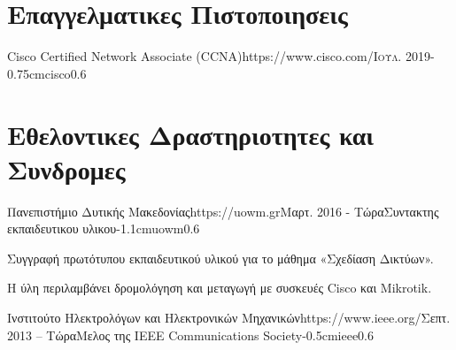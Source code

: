 \documentclass{mycv}
\begin{document}
	
	\vspace{-0.25cm}
	\section{Επαγγελματικες Πιστοποιησεις}
	\begin{EntryDatedLogo}{Cisco Certified Network Associate (CCNA)}{https://www.cisco.com/}{\scshape{Ιουλ. 2019}}{}{-0.75cm}{cisco}{0.6}
	\end{EntryDatedLogo}
	\vspace{0.25cm}
	
	\section{Εθελοντικες Δραστηριοτητες και Συνδρομες}
	\vspace*{0.125cm}	
	\begin{EntryDatedLogo}{Πανεπιστήμιο Δυτικής Μακεδονίας}{https://uowm.gr}{Μαρτ. 2016 - Τώρα}{Συντακτης εκπαιδευτικου υλικου}{-1.1cm}{uowm}{0.6}
	\begin{Itemize}
		\item Συγγραφή πρωτότυπου εκπαιδευτικού υλικού για το μάθημα «Σχεδίαση Δικτύων».
		\item Η ύλη περιλαμβάνει δρομολόγηση και μεταγωγή με συσκευές Cisco και Mikrotik.
	\end{Itemize}
	\end{EntryDatedLogo}

	\vspace*{0.5cm}
	
	\begin{EntryDatedLogo}{Ινστιτούτο Ηλεκτρολόγων και Ηλεκτρονικών Μηχανικών}{https://www.ieee.org/}{Σεπτ. 2013 -- Τώρα}{Μελος της IEEE Communications Society}{-0.5cm}{ieee}{0.6}
	\end{EntryDatedLogo}
\end{document}
